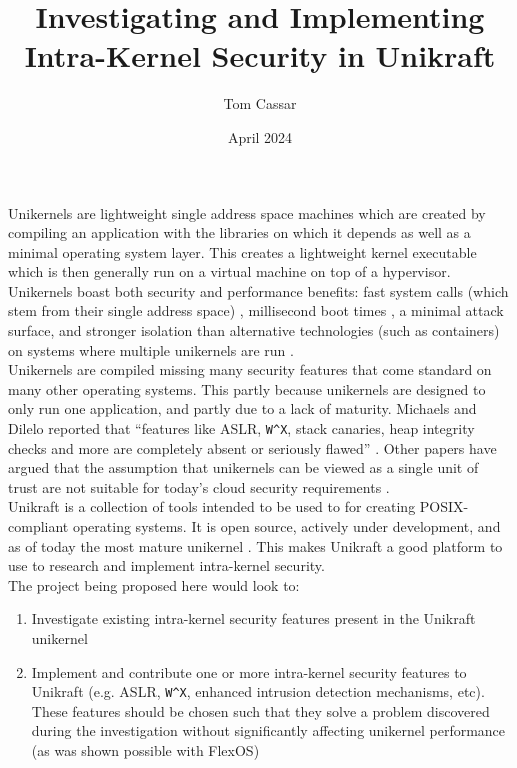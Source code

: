 \documentclass{article}
\title{Investigating and Implementing Intra-Kernel Security in Unikraft}
\author{Tom Cassar}
\date{April 2024}
\begin{document}
\maketitle

\noindent Unikernels are lightweight single address space machines \cite{unikernel-isolation} which are created by compiling an application with the libraries on which it depends as well as a minimal operating system layer. 
This creates a lightweight kernel executable which is then generally run on a virtual machine on top of a hypervisor. 
Unikernels boast both security and performance benefits: fast system calls (which stem from their single address space) \cite{hermitux}, millisecond boot times \cite{unikraft}, a minimal attack surface, and stronger isolation than alternative technologies (such as containers) on systems where multiple unikernels are run \cite{security-perspective}.\\

\noindent Unikernels are compiled missing many security features that come standard on many other operating systems. This partly because unikernels are designed to only run one application, and partly due to a lack of maturity. 
Michaels and Dilelo reported that ``features like ASLR, \texttt{W\^{}X}, stack canaries, heap integrity checks and more are completely absent or seriously flawed'' \cite{michaels2019assessing}.
Other papers have argued that the assumption that unikernels can be viewed as a single unit of trust are not suitable for today's cloud security requirements \cite{unikernel-isolation}.\\

\noindent Unikraft \cite{unikraft-paper} is a collection of tools intended to be used to for creating POSIX-compliant operating systems. 
It is open source, actively under development, and as of today the most mature unikernel \cite{unikraft-coming-age}. 
This makes Unikraft a good platform to use to research and implement intra-kernel security.\\

\noindent The project being proposed here would look to:

\begin{enumerate}
    \item Investigate existing intra-kernel security features present in the Unikraft unikernel
    \item Implement and contribute one or more intra-kernel security features to Unikraft (e.g. ASLR, \texttt{W\^{}X}, enhanced intrusion detection mechanisms, etc). 
    These features should be chosen such that they solve a problem discovered during the investigation without significantly affecting unikernel performance (as was shown possible with FlexOS) \cite{flexos}
\end{enumerate}
\end{document}
